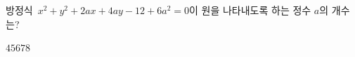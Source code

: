 방정식~$x^2+y^2+2ax+4ay-12+6a^2=0$이 원을 나타내도록 하는 정수 $a$의 개수는?
\begin{choices32}{$4$}{$5$}{$6$}{$7$}{$8$}\end{choices32}
